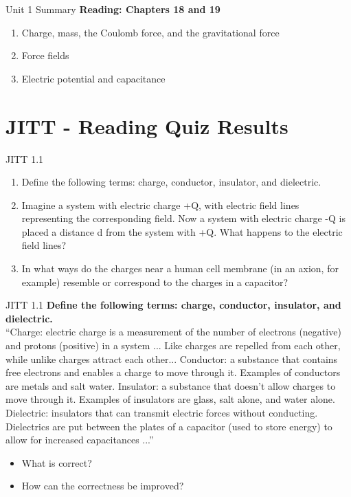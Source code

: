 \documentclass{beamer}
\begin{document}
\begin{frame}{Unit 1 Summary}
\textbf{Reading: Chapters 18 and 19}
\begin{enumerate}
\item Charge, mass, the Coulomb force, and the gravitational force
\item Force fields
\item Electric potential and capacitance
\end{enumerate}
\end{frame}

\section{JITT - Reading Quiz Results}

\begin{frame}{JITT 1.1}
\begin{enumerate}
\item Define the following terms: charge, conductor, insulator, and dielectric.
\item Imagine a system with electric charge +Q, with electric field lines representing the corresponding field.  Now a system with electric charge -Q is placed a distance d from the system with +Q.  What happens to the electric field lines?
\item In what ways do the charges near a human cell membrane (in an axion, for example) resemble or correspond to the charges in a capacitor?
\end{enumerate}
\end{frame}

\begin{frame}{JITT 1.1}
\small
\textbf{Define the following terms: charge, conductor, insulator, and dielectric.} \\ 
``Charge: electric charge is a measurement of the number of electrons (negative) and protons (positive) in a system ... Like charges are repelled from each other, while unlike charges attract each other... Conductor: a substance that contains free electrons and enables a charge to move through it. Examples of conductors are metals and salt water.  Insulator: a substance that doesn't allow charges to move through it. Examples of insulators are glass, salt alone, and water alone.  Dielectric: insulators that can transmit electric forces without conducting. Dielectrics are put between the plates of a capacitor (used to store energy) to allow for increased capacitances ...''
\begin{itemize}
\item What is correct?
\item How can the correctness be improved?
\end{itemize}
\end{frame}
\end{document}
